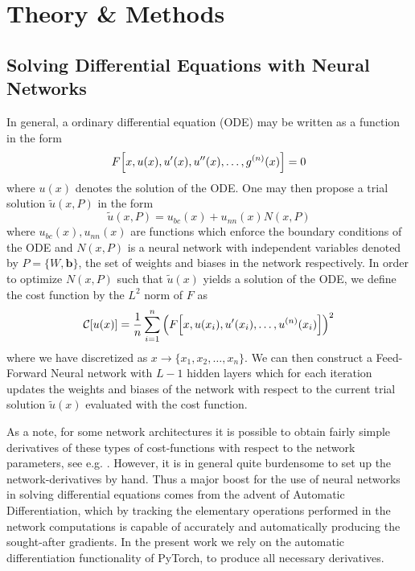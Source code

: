\documentclass[reprint, english, nofootinbib]{revtex4-2}
\begin{document}
\section{Theory \& Methods}

\subsection{Solving Differential Equations with Neural Networks}
\noindent
In general, a ordinary differential equation (ODE) may be written as a function in the form
\begin{equation}
    F \qty[x, u(x), u'(x), u''(x), \dots, g^{(n)}(x)] = 0
\end{equation}    
where $u(x)$ denotes the solution of the ODE. One may then propose a trial solution $\tilde u(x,P)$ in the form
\begin{equation}
    \tilde u(x, P) = u_{bc}(x) + u_{nn}(x)N(x, P) 
\end{equation}
where $u_{bc}(x), u_{nn}(x)$ are functions which enforce the boundary conditions of the ODE and $N(x, P)$ is a neural network with independent variables denoted by $P = \{W, \pmb b\}$, the set of weights and biases in the network respectively. In order to optimize $N(x, P)$ such that $\tilde u(x)$ yields a solution of the ODE, we define the cost function by the $L^2$ norm of $F$ as
\begin{equation}
    \mathcal C\qty[u\qty(x)] = \frac{1}{n} \sum_{i=1}^{n}\qty(F\qty[x, u(x_i), u'(x_i), \dots, u^{(n)}(x_i)])^2
\end{equation}
where we have discretized as $x \rightarrow \{x_1, x_2 ,\dots, x_{n}\}$. We can then construct a Feed-Forward Neural network with $L-1$ hidden layers which for each iteration updates the weights and biases of the network with respect to the current trial solution $\tilde u(x)$ evaluated with the cost function. 


As a note, for some network architectures it is possible to obtain fairly simple derivatives of these types of cost-functions with respect to the network parameters, see e.g. \cite{Lagaris_1998}. However, it is in general quite burdensome to set up the network-derivatives by hand. Thus a major boost for the use of neural networks in solving differential equations comes from the advent of Automatic Differentiation, which by tracking the elementary operations performed in the network computations is capable of accurately and automatically producing the sought-after gradients. In the present work we rely on the automatic differentiation functionality of PyTorch, to produce all necessary derivatives.
\end{document}
